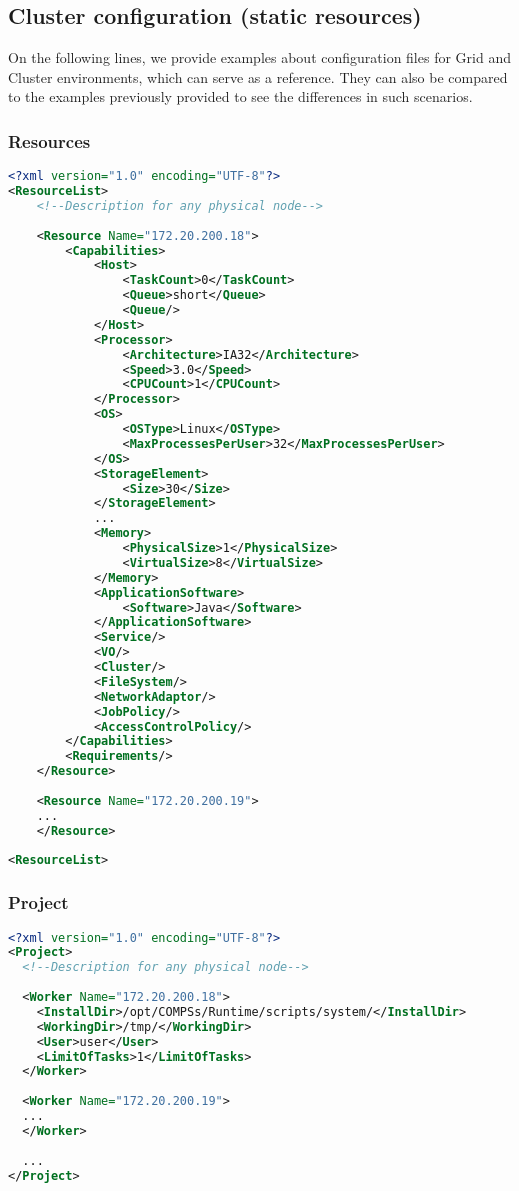 \subsection{Cluster configuration (static resources)}

On the following lines, we provide examples about configuration files for Grid and Cluster environments, 
which can serve as a reference. They can also be compared to the examples previously provided to see the 
differences in such scenarios.

\subsubsection{Resources}

\begin{lstlisting}[language=xml]
<?xml version="1.0" encoding="UTF-8"?>
<ResourceList>
    <!--Description for any physical node-->
    
    <Resource Name="172.20.200.18">
        <Capabilities>
            <Host>
                <TaskCount>0</TaskCount>
                <Queue>short</Queue>
                <Queue/>
            </Host>
            <Processor>
                <Architecture>IA32</Architecture>
                <Speed>3.0</Speed>
                <CPUCount>1</CPUCount>
            </Processor>
            <OS>
                <OSType>Linux</OSType>
                <MaxProcessesPerUser>32</MaxProcessesPerUser>
            </OS>
            <StorageElement>
                <Size>30</Size>
            </StorageElement>
            ...
            <Memory>
                <PhysicalSize>1</PhysicalSize>
                <VirtualSize>8</VirtualSize>
            </Memory>
            <ApplicationSoftware>
                <Software>Java</Software>
            </ApplicationSoftware>
            <Service/>
            <VO/>
            <Cluster/>
            <FileSystem/>
            <NetworkAdaptor/>
            <JobPolicy/>
            <AccessControlPolicy/>
        </Capabilities>
        <Requirements/>
    </Resource>
    
    <Resource Name="172.20.200.19">
    ...
    </Resource>
    
<ResourceList>
\end{lstlisting}

\subsubsection{Project}
\begin{lstlisting}[language=xml]
<?xml version="1.0" encoding="UTF-8"?>
<Project>
  <!--Description for any physical node-->
    
  <Worker Name="172.20.200.18">
    <InstallDir>/opt/COMPSs/Runtime/scripts/system/</InstallDir>
    <WorkingDir>/tmp/</WorkingDir>
    <User>user</User>
    <LimitOfTasks>1</LimitOfTasks>
  </Worker>
    
  <Worker Name="172.20.200.19">
  ...
  </Worker>
    
  ...
</Project>
\end{lstlisting}

